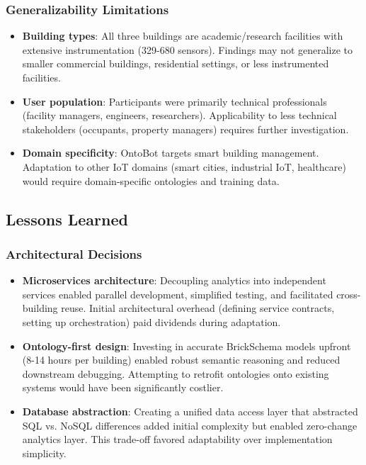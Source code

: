 \documentclass[acmlarge]{acmart}
\begin{document}
\subsubsection{Generalizability Limitations}

\begin{itemize}
    \item \textbf{Building types}: All three buildings are academic/research facilities with extensive instrumentation (329-680 sensors). Findings may not generalize to smaller commercial buildings, residential settings, or less instrumented facilities.
    
    \item \textbf{User population}: Participants were primarily technical professionals (facility managers, engineers, researchers). Applicability to less technical stakeholders (occupants, property managers) requires further investigation.
    
    \item \textbf{Domain specificity}: OntoBot targets smart building management. Adaptation to other IoT domains (smart cities, industrial IoT, healthcare) would require domain-specific ontologies and training data.
\end{itemize}

\subsection{Lessons Learned}

\subsubsection{Architectural Decisions}

\begin{itemize}
    \item \textbf{Microservices architecture}: Decoupling analytics into independent services enabled parallel development, simplified testing, and facilitated cross-building reuse. Initial architectural overhead (defining service contracts, setting up orchestration) paid dividends during adaptation.
    
    \item \textbf{Ontology-first design}: Investing in accurate BrickSchema models upfront (8-14 hours per building) enabled robust semantic reasoning and reduced downstream debugging. Attempting to retrofit ontologies onto existing systems would have been significantly costlier.
    
    \item \textbf{Database abstraction}: Creating a unified data access layer that abstracted SQL vs. NoSQL differences added initial complexity but enabled zero-change analytics layer. This trade-off favored adaptability over implementation simplicity.
\end{itemize}
\end{document}
